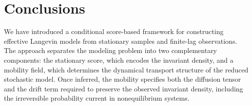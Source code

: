 \documentclass[11pt,twoside,fleqn]{article}
\begin{document}


\section{Conclusions}
\label{sec:conclusions}

We have introduced a conditional score-based framework for constructing
effective Langevin models from stationary samples and finite-lag observations.
The approach separates the modeling problem into two complementary components:
the stationary score, which encodes the invariant density, and a mobility field,
which determines the dynamical transport structure of the reduced stochastic
model. Once inferred, the mobility specifies both the diffusion tensor and the
drift term required to preserve the observed invariant density, including the
irreversible probability current in nonequilibrium systems.
\end{document}

